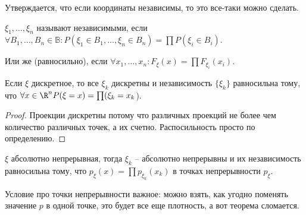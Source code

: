 \begin{minipage}[c]{0.3\textwidth}
\end{minipage}
\begin{minipage}[c]{0.3\textwidth}
\end{minipage}
\begin{minipage}[c]{0.3\textwidth}
\end{minipage}

Утверждается, что если координаты независимы, то это все-таки можно сделать.
\begin{Def}
$\xi_1, \dots, \xi_n$ называют независимыми, если $\forall B_1, \dots, B_n \in \mathbb{B}\colon P(\xi_1 \in B_1, \dots, \xi_n \in B_n) = \prod P(\xi_i \in B_i)$.

Или же (равносильно), если $\forall x_1, \dots, x_n\colon F_{\xi}(x) = \prod F_{\xi_i}(x_i)$.
\end{Def}
\begin{theorem}
Если $\xi$ дискретное, то все $\xi_k$ дискретны и независимость $\{\xi_k\}$ равносильна тому, что $\forall x \in \R^n P(\xi=x) = \prod (\xi_k = x_k$).
\end{theorem}
\begin{proof}
Проекции дискретны потому что различных проекций не более чем количество различных точек, а их счетно. 
Распосильность просто по определению.
\end{proof}
\begin{theorem}
$\xi$ абсолютно непрерывная, тогда $\xi_k$ -- абсолютно непрерывны и их независимость равносильна тому, что $p_{\xi}(x) = \prod p_{\xi_k}(x_k)$ в точках непрерывности $p_{\xi}$.
\end{theorem}
\begin{Rem}
Условие про точки непрерывности важное: можно взять, как угодно поменять значение $p$ в одной точке, это будет все еще плотность, а вот теорема сломается.
\end{Rem}

